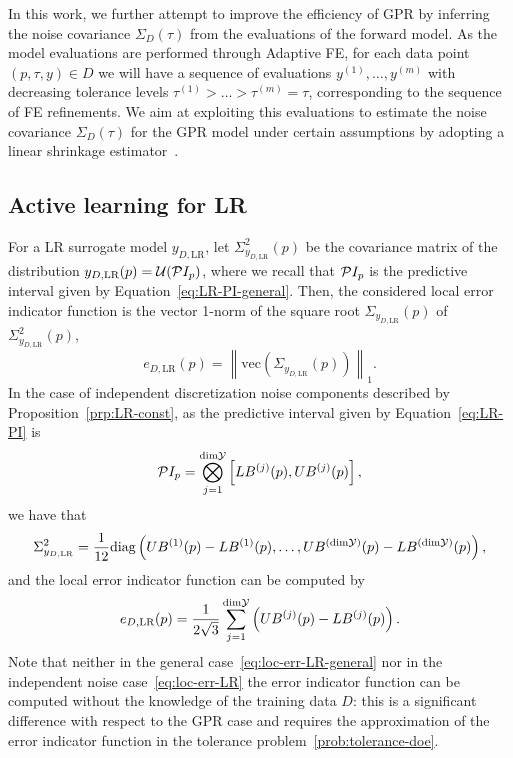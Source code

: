In this work, we further attempt to improve the efficiency of GPR by inferring the noise covariance $\Sigma_D(\tau)$ from the evaluations of the forward model.
As the model evaluations are performed through Adaptive FE, for each data point $(p, \tau, y) \in D$ we will have a sequence of evaluations $y^{(1)}, \dots, y^{(m)}$ with decreasing tolerance levels $\tau^{(1)} > \dots > \tau^{(m)} = \tau$, corresponding to the sequence of FE refinements.
We aim at exploiting this evaluations to estimate the noise covariance $\Sigma_D(\tau)$ for the GPR model under certain assumptions by adopting a linear shrinkage estimator~\cite{LedoitWolf2019}.



\subsection{Active learning for LR}\label{sec:LRAL}

For a LR surrogate model $y_{D,\text{LR}}$, let $\Sigma^2_{y_{D,\text{LR}}}(p)$ be the covariance matrix of the distribution $y_{D,\text{LR}}(p) = \mathcal U (\mathcal PI_p)$, where we recall that $\mathcal PI_p$ is the predictive interval given by Equation~\eqref{eq:LR-PI-general}.\newline
Then, the considered local error indicator function is the vector 1-norm of the square root $\Sigma_{y_{D,\text{LR}}}(p)$ of $\Sigma^2_{y_{D,\text{LR}}}(p)$,
\begin{equation} \label{eq:loc-err-LR-general}
    e_{D, \text{LR}}(p) = \left\| \text{vec}(\Sigma_{y_{D,\text{LR}}}(p)) \right\|_1.
\end{equation}
In the case of independent discretization noise components described by Proposition~\ref{prp:LR-const}, as the predictive interval given by Equation~\eqref{eq:LR-PI} is
\begin{equation*}
    \mathcal PI_p = \bigotimes_{j=1}^{\text{dim}\mathcal Y} \left[ LB^{(j)}(p), UB^{(j)}(p)\right],
\end{equation*}
we have that
\[
    \Sigma^2_{y_{D,\text{LR}}} = \frac{1}{12} \text{diag} \left( UB^{(1)}(p) - LB^{(1)}(p), \dots, UB^{(\text{dim}\mathcal Y)}(p) - LB^{(\text{dim}\mathcal Y)}(p) \right),
\] and the local error indicator function can be computed by 
\begin{equation} \label{eq:loc-err-LR}
    e_{D, \text{LR}}(p) = \frac{1}{2\sqrt{3}} \sum_{j=1}^{\text{dim}\mathcal Y} \left( UB^{(j)}(p) - LB^{(j)}(p) \right).
\end{equation}
Note that neither in the general case~\eqref{eq:loc-err-LR-general} nor in the independent noise case~\eqref{eq:loc-err-LR} the error indicator function can be computed without the knowledge of the training data $D$: this is a significant difference with respect to the GPR case and requires the approximation of the error indicator function in the tolerance problem~\eqref{prob:tolerance-doe}.\medbreak

